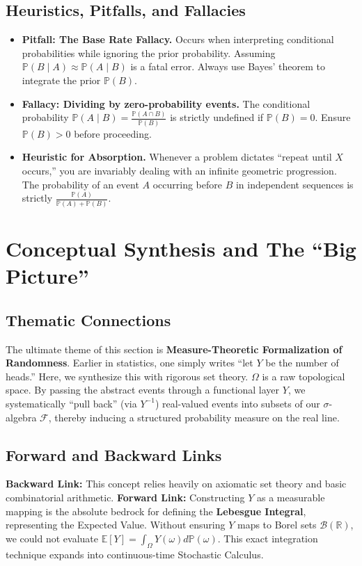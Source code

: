 \documentclass[11pt]{article}
\theoremstyle{definition}
\theoremstyle{plain}
\theoremstyle{remark}
\newcommand{\R}{\mathbb{R}}
\newcommand{\F}{\mathcal{F}}
\newcommand{\B}{\mathcal{B}}
\newcommand{\E}{\mathbb{E}}
\renewcommand{\P}{\mathbb{P}}
\newcommand{\1}{\mathbf{1}}
\begin{document}
\subsection{Heuristics, Pitfalls, and Fallacies}
\begin{itemize}
    \item \textbf{Pitfall: The Base Rate Fallacy.} Occurs when interpreting conditional probabilities while ignoring the prior probability. Assuming $\P(B \mid A) \approx \P(A \mid B)$ is a fatal error. Always use Bayes' theorem to integrate the prior $\P(B)$.
    \item \textbf{Fallacy: Dividing by zero-probability events.} The conditional probability $\P(A \mid B) = \frac{\P(A \cap B)}{\P(B)}$ is strictly undefined if $\P(B) = 0$. Ensure $\P(B) > 0$ before proceeding.
    \item \textbf{Heuristic for Absorption.} Whenever a problem dictates ``repeat until $X$ occurs,'' you are invariably dealing with an infinite geometric progression. The probability of an event $A$ occurring before $B$ in independent sequences is strictly $\frac{\P(A)}{\P(A) + \P(B)}$.
\end{itemize}

\section{Conceptual Synthesis and The ``Big Picture''}

\subsection{Thematic Connections}
The ultimate theme of this section is \textbf{Measure-Theoretic Formalization of Randomness}. Earlier in statistics, one simply writes ``let $Y$ be the number of heads.'' Here, we synthesize this with rigorous set theory. $\Omega$ is a raw topological space. By passing the abstract events through a functional layer $Y$, we systematically ``pull back'' (via $Y^{-1}$) real-valued events into subsets of our $\sigma$-algebra $\F$, thereby inducing a structured probability measure on the real line. 

\subsection{Forward and Backward Links}
\textbf{Backward Link:} This concept relies heavily on axiomatic set theory and basic combinatorial arithmetic.
\textbf{Forward Link:} Constructing $Y$ as a measurable mapping is the absolute bedrock for defining the \textbf{Lebesgue Integral}, representing the Expected Value. Without ensuring $Y$ maps to Borel sets $\B(\R)$, we could not evaluate $\E[Y] = \int_{\Omega} Y(\omega) d\P(\omega)$. This exact integration technique expands into continuous-time Stochastic Calculus.
\end{document}
